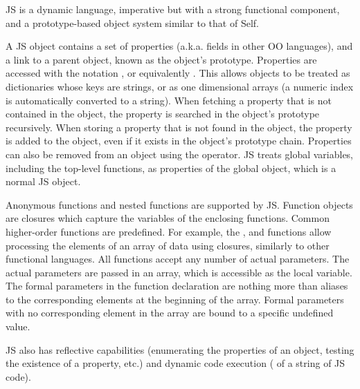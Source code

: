 JS is a dynamic language, imperative but with a strong functional component,
and a prototype-based object system similar to that of Self.

A JS object contains a set of properties (a.k.a. fields in other OO languages),
and a link to a parent object, known as the object's prototype. Properties are
accessed with the notation , or equivalently .
This allows objects to be treated as dictionaries whose keys are strings, or as
one dimensional arrays (a numeric index is automatically converted to a
string).  When fetching a property that is not contained in the object, the
property is searched in the object's prototype recursively. When storing a
property that is not found in the object, the property is added to the object,
even if it exists in the object's prototype chain. Properties can also be
removed from an object using the  operator. JS treats global
variables, including the top-level functions, as properties of the global
object, which is a normal JS object.

Anonymous functions and nested functions are supported by JS. Function objects
are closures which capture the variables of the enclosing functions. Common
higher-order functions are predefined. For example, the , 
and  functions allow processing the elements of an array of data
using closures, similarly to other functional languages. All functions accept
any number of actual parameters. The actual parameters are passed in an array,
which is accessible as the  local variable. The formal parameters
in the function declaration are nothing more than aliases to the corresponding
elements at the beginning of the array. Formal parameters with no corresponding
element in the array are bound to a specific undefined value.

JS also has reflective capabilities (enumerating the properties of an object,
testing the existence of a property, etc.) and dynamic code execution
( of a string of JS code).  



